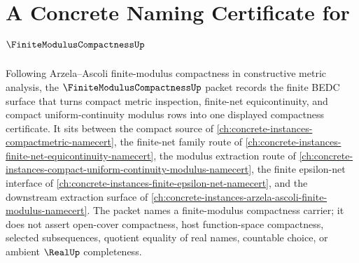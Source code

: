 \chapter{A Concrete Naming Certificate for $\FiniteModulusCompactnessUp$}
\label{ch:concrete-instances-finite-modulus-compactness-namecert}

Following Arzela--Ascoli finite-modulus compactness in constructive metric analysis, the $\FiniteModulusCompactnessUp$ packet records the finite BEDC surface that turns compact metric inspection, finite-net equicontinuity, and compact uniform-continuity modulus rows into one displayed compactness certificate. It sits between the compact source of \autoref{ch:concrete-instances-compactmetric-namecert}, the finite-net family route of \autoref{ch:concrete-instances-finite-net-equicontinuity-namecert}, the modulus extraction route of \autoref{ch:concrete-instances-compact-uniform-continuity-modulus-namecert}, the finite epsilon-net interface of \autoref{ch:concrete-instances-finite-epsilon-net-namecert}, and the downstream extraction surface of \autoref{ch:concrete-instances-arzela-ascoli-finite-modulus-namecert}. The packet names a finite-modulus compactness carrier; it does not assert open-cover compactness, host function-space compactness, selected subsequences, quotient equality of real names, countable choice, or ambient $\RealUp$ completeness.

